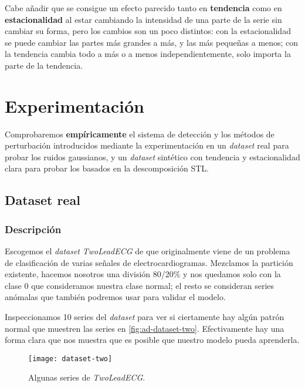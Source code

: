 Cabe añadir que se consigue un efecto parecido tanto en \textbf{tendencia} como en \textbf{estacionalidad} al estar cambiando la intensidad de una parte de la serie sin cambiar su forma, pero los cambios son un poco distintos: con la estacionalidad se puede cambiar las partes más grandes a más, y las más pequeñas a menos; con la tendencia cambia todo a más o a menos independientemente, solo importa la parte de la tendencia.

\chapter{Experimentación}\label{ch:ad-experimentacion}

Comprobaremos \textbf{empíricamente} el sistema de detección y los métodos de perturbación introducidos mediante la experimentación en un \emph{dataset} real para probar los ruidos gaussianos, y un \emph{dataset} sintético con tendencia y estacionalidad clara para probar los basados en la descomposición STL.

\section{Dataset real}

\subsection{Descripción}

Escogemos el \emph{dataset} \emph{TwoLeadECG} de \cite{bagnall2020ts} que originalmente viene de un problema de clasificación de varias señales de electrocardiogramas. Mezclamos la partición existente, hacemos nosotros una división 80/20\% y nos quedamos solo con la clase 0 que consideramos nuestra clase normal; el resto se consideran series anómalas que también podremos usar para validar el modelo.

Inspeccionamos 10 series del \emph{dataset} para ver si ciertamente hay algún patrón normal que muestren las series en \autoref{fig:ad-dataset-two}. Efectivamente hay una forma clara que nos muestra que es posible que nuestro modelo pueda aprenderla.

\begin{figure}[htpb]
  \centering
  \texttt{[image: dataset-two]}
  \caption{Algunas series de \emph{TwoLeadECG}.}
  \label{fig:ad-dataset-two}
\end{figure}

